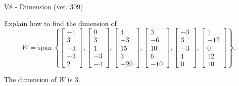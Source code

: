 \begin{exercise}
  \begin{exerciseTitle}V8 - Dimension (ver. 309)\end{exerciseTitle}
  \begin{exerciseStatement}
    Explain how to find the dimension of 
\[W=\mathrm{span}\ \left\{\left[\begin{array}{r}
-1 \\
3 \\
-3 \\
-3 \\
2
\end{array}\right] , \left[\begin{array}{r}
0 \\
3 \\
1 \\
-3 \\
-4
\end{array}\right] , \left[\begin{array}{r}
4 \\
-3 \\
15 \\
3 \\
-20
\end{array}\right] , \left[\begin{array}{r}
3 \\
-6 \\
10 \\
6 \\
-10
\end{array}\right] , \left[\begin{array}{r}
-3 \\
3 \\
-3 \\
1 \\
0
\end{array}\right] , \left[\begin{array}{r}
1 \\
-12 \\
0 \\
12 \\
10
\end{array}\right]\right\}.\]



  \end{exerciseStatement}
  \begin{exerciseAnswer}
   The dimension of \(W\) is  \(3\).
  


  \end{exerciseAnswer}
\end{exercise}